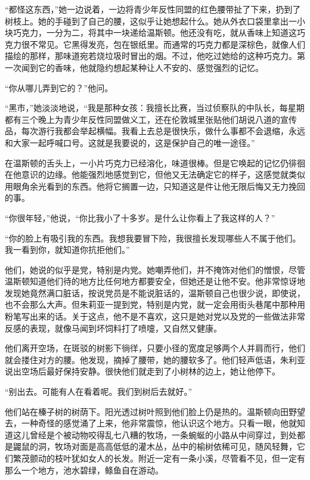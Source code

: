 ``都怪这东西，''她一边说着，一边将青少年反性同盟的红色腰带扯了下来，扔到了树枝上。她的手碰到了自己的腰，这似乎让她想起什么。她从外衣口袋里拿出一小块巧克力，一分为二，将其中一块递给温斯顿。他还没有吃，就从香味上知道这巧克力很不常见。它黑得发亮，包在银纸里。而通常的巧克力都是深棕色，就像人们描绘的那样，那味道宛若烧垃圾时冒出的烟。不过，他吃过她给的这种巧克力。第一次闻到它的香味，他就隐约想起某种让人不安的、感觉强烈的记忆。

``你从哪儿弄到它的？''他问。

``黑市，''她淡淡地说，``我是那种女孩：我擅长比赛，当过侦察队的中队长，每星期都有三个晚上为青少年反性同盟做义工，还在伦敦城里张贴他们胡说八道的宣传品，每次游行我都会举起横幅。我看上去总是很快乐，做什么事都不会退缩，永远和大家一起呼喊口号。这就是我要说的，这是保护自己的唯一途径。''

在温斯顿的舌头上，一小片巧克力已经溶化，味道很棒。但是它唤起的记忆仍徘徊在他意识的边缘。他能强烈地感觉到它，但他又无法确定它的样子，这感觉就类似用眼角余光看到的东西。他将它搁置一边，只知道这是件让他无限后悔又无力挽回的事。

``你很年轻，''他说，``你比我小了十多岁。是什么让你看上了我这样的人？''

``你的脸上有吸引我的东西。我想我要冒下险，我很擅长发现哪些人不属于他们。我一看到你，就知道你抗拒他们。''

他们，她说的似乎是党，特别是内党。她嘲弄他们，并不掩饰对他们的憎恨，尽管温斯顿知道他们待的地方比任何地方都要安全，但她还是让他不安。他非常惊讶地发现她竟然满口脏话，按说党员是不能说脏话的，温斯顿自己也很少说，即使说，也不会那么大声。但朱莉亚一提到党，特别是内党，就一定会用街头巷尾中那种用粉笔写出来的话。关于这点，他不是不喜欢，这只是她对党以及党的一些做法非常反感的表现，就像马闻到坏饲料打了喷嚏，又自然又健康。

他们离开空场，在斑驳的树影下徜徉，只要小径的宽度足够两个人并肩而行，他们就会搂住对方的腰。他发现，摘掉了腰带，她的腰软多了。他们轻声低语，朱利亚说出空场后最好保持安静。很快他们就走到了小树林的边上，她让他停下。

``别出去。可能有人在看着呢。我们到树后去就好。''

他们站在榛子树的树荫下。阳光透过树叶照到他们脸上仍是热的。温斯顿向田野望去，一种奇怪的感觉涌了上来，他非常震惊，他认识这个地方。只看一眼，他就知道这儿曾经是个被动物咬得乱七八糟的牧场，一条蜿蜒的小路从中间穿过，到处都是鼹鼠的洞，牧场对面是高高低低的灌木丛，丛中的榆树依稀可见，随风轻舞，它们繁茂颤动的枝叶犹如女人的长发。附近一定有一条小溪，尽管看不见，但一定有那么一个地方，池水碧绿，鲦鱼自在游动。

